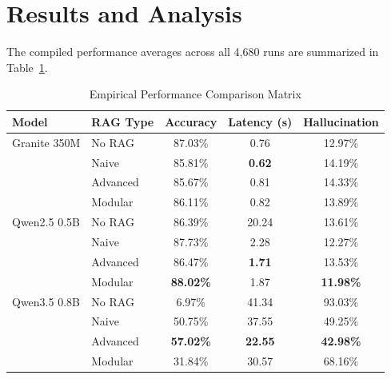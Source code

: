 \documentclass[conference]{IEEEtran}
\begin{document}
\section{Results and Analysis}
The compiled performance averages across all 4,680 runs are summarized in Table~\ref{tab:performance_matrix}.
\begin{table}[h]
\centering
\caption{Empirical Performance Comparison Matrix}
\label{tab:performance_matrix}
\begin{tabular}{llccc}
\toprule
\textbf{Model} & \textbf{RAG Type} & \textbf{Accuracy} & \textbf{Latency (s)} & \textbf{Hallucination} \\
\midrule
Granite 350M & No RAG & 87.03\% & 0.76 & 12.97\% \\
             & Naive & 85.81\% & \textbf{0.62} & 14.19\% \\
             & Advanced & 85.67\% & 0.81 & 14.33\% \\
             & Modular & 86.11\% & 0.82 & 13.89\% \\
\midrule
Qwen2.5 0.5B & No RAG & 86.39\% & 20.24 & 13.61\% \\
             & Naive & 87.73\% & 2.28 & 12.27\% \\
             & Advanced & 86.47\% & \textbf{1.71} & 13.53\% \\
             & Modular & \textbf{88.02\%} & 1.87 & \textbf{11.98\%} \\
\midrule
Qwen3.5 0.8B & No RAG & 6.97\% & 41.34 & 93.03\% \\
             & Naive & 50.75\% & 37.55 & 49.25\% \\
             & Advanced & \textbf{57.02\%} & \textbf{22.55} & \textbf{42.98\%} \\
             & Modular & 31.84\% & 30.57 & 68.16\% \\
\bottomrule
\end{tabular}
\end{table}
\end{document}
